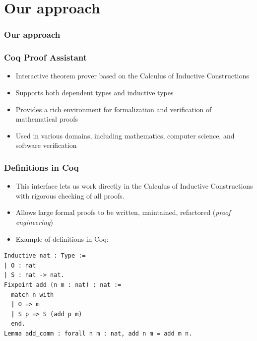 \documentclass{beamer}
\begin{document}
\section{Our approach}
\begin{frame}
\frametitle{Our approach}
\begin{figure}
\centering
{}
\end {figure}
\end{frame}

\begin{frame}
\frametitle{Coq Proof Assistant}
\begin{itemize}
\item Interactive theorem prover based on the Calculus of Inductive Constructions
\item Supports both dependent types and inductive types
\item Provides a rich environment for formalization and verification of mathematical proofs
\item Used in various domains, including mathematics, computer science, and software verification
\end{itemize}
\end{frame}

\begin{frame}[fragile]
\frametitle{Definitions in Coq}
\begin{itemize}
\item This interface lets us work directly in the Calculus of
  Inductive Constructions with rigorous checking of all proofs.
\item Allows large formal proofs to be written, maintained, refactored
  (\textit{proof engineering})
\item Example of definitions in Coq:
\end{itemize}
\begin{verbatim}
Inductive nat : Type :=
| O : nat
| S : nat -> nat.
Fixpoint add (n m : nat) : nat :=
  match n with
  | O => m
  | S p => S (add p m)
  end.
Lemma add_comm : forall n m : nat, add n m = add m n.
\end{verbatim}

\end{frame}
\end{document}
